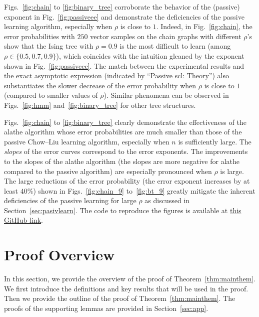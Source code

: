 Figs.~\ref{fig:chain} to \ref{fig:binary_tree} corroborate the behavior of the (passive) exponent in Fig.~\ref{fig:passiveee} and demonstrate the deficiencies of the passive learning algorithm, especially when $\rho $ is close to $1$. Indeed, in Fig.~\ref{fig:chain}, the error probabilities with $250$ vector samples on the chain graphs with different $\rho$'s show that the Ising tree with $\rho=0.9$ is the most difficult to learn (among $\rho \in \{0.5, 0.7, 0.9\}$), which coincides with the intuition gleaned by the exponent shown in Fig.~\ref{fig:passiveee}. The match between the experimental results and the exact asymptotic expression (indicated by ``Passive \ac{scl}: Theory'') also substantiates the slower decrease of the error probability when $\rho$ is close to $1$ (compared to smaller values of $\rho$). Similar phenomena can be observed in Figs.~\ref{fig:hmm} and~\ref{fig:binary_tree} for other tree structures.

Figs.~\ref{fig:chain} to \ref{fig:binary_tree} clearly demonstrate the effectiveness of the \ac{alathe} algorithm whose error probabilities are much smaller than those of the passive Chow--Liu learning algorithm, especially when $n$ is sufficiently large. %
The {\em slopes} of the error curves correspond to the error exponents.  
The improvements to  the slopes   of the \ac{alathe} algorithm  (the slopes are more negative for \ac{alathe} compared to the passive algorithm) are especially pronounced when $\rho$ is large. %
The large reductions of the error probability (the error exponent increases by at least $40\%$) shown in Figs.~\ref{fig:chain_9} to~\ref{fig:bt_9} greatly mitigate the inherent deficiencies of the passive learning for large $\rho$ as discussed in Section~\ref{sec:pasivlearn}. The code to reproduce the figures is available at  \textcolor{blue}{\href{https://github.com/Zhang-Fengzhuo/Active-LATHE}{this  GitHub link}}.

\section{Proof Overview}\label{sec:pfview}
In this section, we provide the overview of the proof of Theorem~\ref{thm:mainthem}. We first introduce the definitions and key results that will be used in the proof. Then we provide the outline of the proof of Theorem~\ref{thm:mainthem}. The proofs of the supporting lemmas are provided in Section~\ref{sec:app}.

